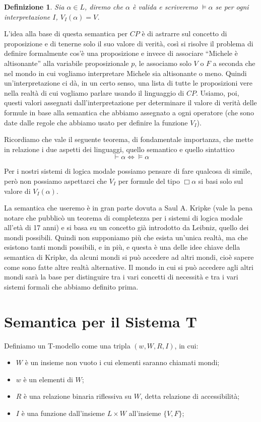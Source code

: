 \documentclass[a4paper, 12pt]{article}
\newtheorem{definition}{Definizione}
\begin{document}
\begin{definition}
Sia $\alpha \in L$, diremo che $\alpha$ è valida e scriveremo $\vDash \alpha$ se
per ogni interpretazione $I$, $V_I(\alpha) = V$.
\end{definition}

L'idea alla base di questa semantica per $CP$ è di astrarre sul concetto di proposizione
e di tenerne solo il suo valore di verità, così si risolve il problema di definire
formalmente cos'è una proposizione e invece di associare ``Michele è altisonante''
alla variabile proposizionale $p$, le associamo solo $V$ o $F$ a seconda che nel mondo
in cui vogliamo interpretare Michele sia altisonante o meno.
Quindi un'interpretazione ci dà, in un certo senso, una lista di tutte le proposizioni
vere nella realtà di cui vogliamo parlare usando il linguaggio di $CP$.
Usiamo, poi, questi valori assegnati dall'interpretazione per determinare il valore di verità delle formule
in base alla semantica che abbiamo assegnato a ogni operatore (che sono date dalle regole
che abbiamo usato per definire la funzione $V_I$).

Ricordiamo che vale il seguente teorema, di fondamentale importanza,
che mette in relazione i due aspetti dei linguaggi, quello semantico e quello sintattico
$$\vdash \alpha \Leftrightarrow \vDash \alpha$$

Per i nostri sistemi di logica modale possiamo pensare di fare qualcosa di simile,
però non possiamo aspettarci che $V_I$ per formule del tipo $\Box \alpha$ si basi solo
sul valore di $V_I(\alpha)$.

La semantica che useremo è in gran parte dovuta a Saul A. Kripke (vale la pena notare
che pubblicò un teorema di completezza per i sistemi di logica modale all'età di 17 anni)
e si basa su un concetto già introdotto da Leibniz, quello dei mondi possibili.
Quindi non supponiamo più che esista un'unica realtà, ma che esistono tanti mondi possibili,
e in più, e questa è una delle idee chiave della semantica di Kripke, da alcuni mondi
si può accedere ad altri mondi, cioè sapere come sono fatte altre realtà alternative.
Il mondo in cui si può accedere agli altri mondi sarà la base per distinguire
tra i vari concetti di necessità e tra i vari sistemi formali che abbiamo definito prima.

\section{Semantica per il Sistema T}
Definiamo un T-modello come una tripla $(w, W, R, I)$, in cui:
\begin{itemize}
\item $W$ è un insieme non vuoto i cui elementi saranno chiamati mondi;
\item $w$ è un elementi di $W$;
\item $R$ è una relazione binaria riflessiva su $W$, detta relazione di accessibilità;
\item $I$ è una funzione dall'insieme $L \times W$ all'insieme $\{V, F\}$;
\end{itemize}
\end{document}

